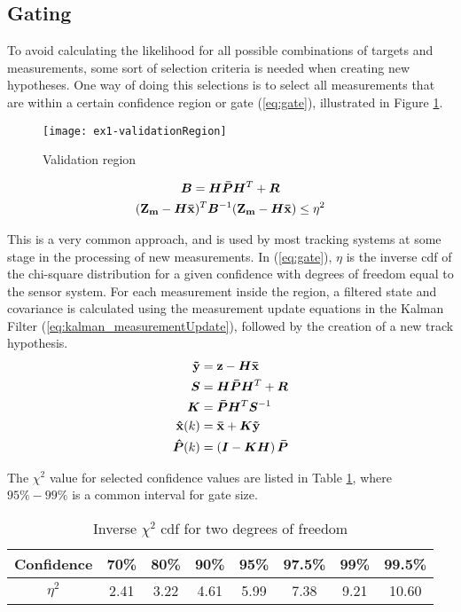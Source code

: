 \subsection{Gating}
To avoid calculating the likelihood for all possible combinations of targets and measurements, some sort of selection criteria is needed when creating new hypotheses. One way of doing this selections is to select all measurements that are within a certain confidence region or gate (\ref{eq:gate}), illustrated in Figure \ref{fig:validation_region}.
\begin{figure}[H]
\centering
\texttt{[image: ex1-validationRegion]}
\caption{Validation region}
\label{fig:validation_region}
\end{figure}
\begin{equation}
\begin{gathered}
\bm{B}	= \bm{H} \bm{\bar{P}} \bm{H}^T + \bm{R} \\
(\boldsymbol{\mathbf{Z_m}} - \bm{H}\boldsymbol{\mathbf{\bar{x}}})^T	\bm{B}^{-1} (\boldsymbol{\mathbf{Z_m}} - \bm{H}\boldsymbol{\mathbf{\bar{x}}}) \leq \eta^2
\label{eq:gate}
\end{gathered}
\end{equation}

This is a very common approach, and is used by most tracking systems at some stage in the processing of new measurements. In (\ref{eq:gate}), $\eta$ is the inverse \gls{cdf} of the chi-square distribution for a given confidence with degrees of freedom equal to the sensor system. For each measurement inside the region, a filtered state and covariance is calculated using the measurement update equations in the Kalman Filter (\ref{eq:kalman_measurementUpdate}), followed by the creation of a new track hypothesis.
\begin{equation}
\begin{split}
\boldsymbol{\mathbf{\tilde{y}}}	&= \boldsymbol{\mathbf{z}} - \bm{H} \boldsymbol{\mathbf{\bar{x}}} \\
\bm{S}			&= \bm{H} \bm{\bar{P}} \bm{H}^T + \bm{R} \\
\bm{K} 			&= \bm{\bar{P}} \bm{H}^T \bm{S}^{-1} \\
\boldsymbol{\mathbf{\hat{x}}}(k) 	&= \boldsymbol{\mathbf{\bar{x}}} + \bm{K} \boldsymbol{\mathbf{\tilde{y}}} \\
\bm{\hat{P}}(k) 	&= \left( \bm{I} - \bm{K} \bm{H} \right) \bm{\bar{P}}
\end{split}
\label{eq:kalman_measurementUpdate}
\end{equation}

The $\chi^2$ value for selected confidence values are listed in Table \ref{tab:chi_square}, where $95\% - 99\%$ is a common interval for gate size. 
\begin{table}[H]
\centering
\begin{tabular}{c c c c c c c c}
Confidence 	& 70\% 	& 80\% 	& 90\% 	& 95\% 	& 97.5\% 	& 99\% 	& 99.5\% \\ \hline
$\eta^2$ 	& 2.41 	& 3.22 	& 4.61 	& 5.99 	& 7.38 		& 9.21 	& 10.60
\end{tabular}
\caption{Inverse $\chi^2$ \gls{cdf} for two degrees of freedom}
\label{tab:chi_square}
\end{table}


